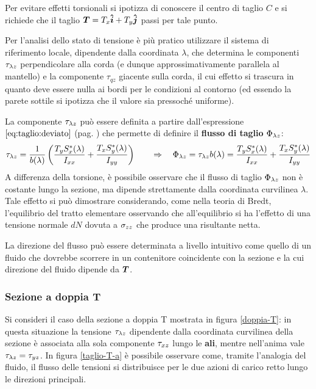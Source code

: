 		Per evitare effetti torsionali si ipotizza di conoscere il centro di taglio $C$ e si richiede che il taglio $\boldsymbol{T} = T_x \boldsymbol{\hat{i}} + T_y \boldsymbol{\hat{j}}$ passi per tale punto.
		
		
		Per l'analisi dello stato di tensione è più pratico utilizzare il sistema di riferimento locale, dipendente dalla coordinata $\lambda$, che determina le componenti $\tau_{\lambda z}$ perpendicolare alla corda (e dunque approssimativamente parallela al mantello) e la componente $\tau_{qz}$ giacente sulla corda, il cui effetto si trascura in quanto deve essere nulla ai bordi per le condizioni al contorno (ed essendo la parete sottile si ipotizza che il valore sia pressoché uniforme).
		
		La componente $\tau_{\lambda z}$ può essere definita a partire dall'espressione $\ref{eq:taglio:deviato}$ (pag. \pageref{eq:taglio:deviato}) che permette di definire il \textbf{flusso di taglio} $\Phi_{\lambda z}$:
		\[\tau_{\lambda z} = \frac 1{b(\lambda)} \left( \frac{T_y S_x^*(\lambda)}{I_{xx}} + \frac{T_x S_y^*(\lambda)}{I_{yy}} \right) \qquad \Rightarrow \quad \Phi_{\lambda z} = \tau_{\lambda z} b(\lambda) = \frac{T_y S_x^*(\lambda)}{I_{xx}} + \frac{T_x S_y^*(\lambda)}{I_{yy}} \]
		A differenza della torsione, è possibile osservare che il flusso di taglio $\Phi_{\lambda z}$ non è costante lungo la sezione, ma dipende strettamente dalla coordinata curvilinea $\lambda$.\\
		Tale effetto si può dimostrare considerando, come nella teoria di Bredt, l'equilibrio del tratto elementare osservando che all'equilibrio si ha l'effetto di una tensione normale $dN$ dovuta a $\sigma_{zz}$ che produce una risultante netta.
		
		La direzione del flusso può essere determinata a livello intuitivo come quello di un fluido che dovrebbe scorrere in un contenitore coincidente con la sezione e la cui direzione del fluido dipende da $\boldsymbol{T}$.
		
	\subsubsection{Sezione a doppia T}
		Si consideri il caso della sezione a doppia T mostrata in figura \ref{doppia-T}: in questa situazione la tensione $\tau_{\lambda z}$ dipendente dalla coordinata curvilinea della sezione è associata alla sola componente $\tau_{xz}$ lungo le \textbf{ali}, mentre nell'anima vale $\tau_{\lambda z} = \tau_{yz}$.
		In figura \ref{taglio-T-a} è possibile osservare come, tramite l'analogia del fluido, il flusso delle tensioni si distribuisce per le due azioni di carico retto lungo le direzioni principali.
		
